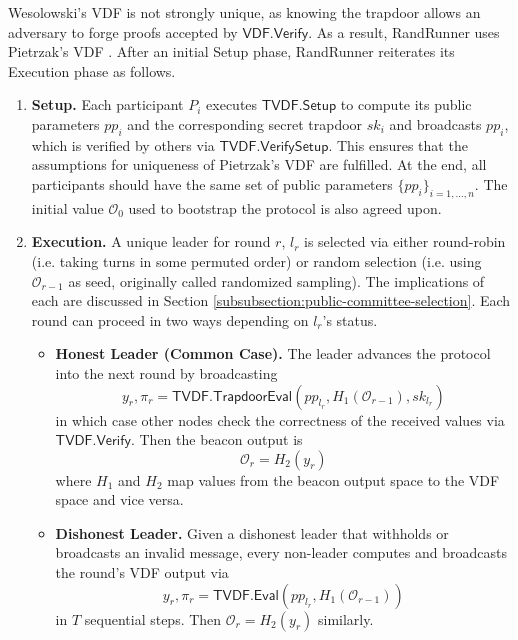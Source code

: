 \documentclass[letterpaper,twocolumn,10pt]{article}
\theoremstyle{definition}
\theoremstyle{remark}
\begin{document}
Wesolowski's VDF \cite{wesolowski2019efficient} is not strongly unique, as knowing the trapdoor allows an adversary to forge proofs accepted by $\mathsf{VDF.Verify}$. As a result, RandRunner uses Pietrzak's VDF \cite{pietrzak2018simple}. After an initial Setup phase, RandRunner reiterates its Execution phase as follows.
\begin{enumerate}
    \item \textbf{Setup.} Each participant $P_i$ executes $\mathsf{TVDF.Setup}$ to compute its public parameters $pp_i$ and the corresponding secret trapdoor $sk_i$ and broadcasts $pp_i$, which is verified by others via $\mathsf{TVDF.VerifySetup}$. This ensures that the assumptions for uniqueness of Pietrzak's VDF are fulfilled. At the end, all participants should have the same set of public parameters $\{pp_i\}_{i = 1, ..., n}$. The initial value $\mathcal{O}_0$ used to bootstrap the protocol is also agreed upon.
    \item \textbf{Execution.} A unique leader for round $r$, $l_r$ is selected via either round-robin (i.e. taking turns in some permuted order) or random selection (i.e. using $\mathcal{O}_{r - 1}$ as seed, originally called randomized sampling). The implications of each are discussed in Section \ref{subsubsection:public-committee-selection}. Each round can proceed in two ways depending on $l_r$'s status.
    \begin{itemize}
        \item \textbf{Honest Leader (Common Case).} The leader advances the protocol into the next round by broadcasting
        $$y_r, \pi_r = \mathsf{TVDF.TrapdoorEval}(pp_{l_r}, H_1(\mathcal{O}_{r - 1}), sk_{l_r})$$
        in which case other nodes check the correctness of the received values via $\mathsf{TVDF.Verify}$. Then the beacon output is
        $$\mathcal{O}_r = H_2(y_r)$$
        where $H_1$ and $H_2$ map values from the beacon output space to the VDF space and vice versa.
        \item \textbf{Dishonest Leader.} Given a dishonest leader that withholds or broadcasts an invalid message, every non-leader computes and broadcasts the round's VDF output via
        $$y_r, \pi_r = \mathsf{TVDF.Eval}(pp_{l_r}, H_1(\mathcal{O}_{r - 1}))$$
        in $T$ sequential steps. Then $\mathcal{O}_r = H_2(y_r)$ similarly.
    \end{itemize}
\end{enumerate}
\end{document}
